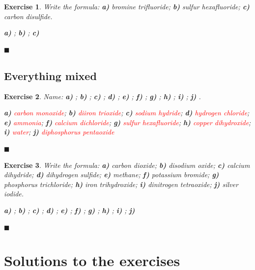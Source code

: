 \documentclass[12pt]{article}
\theoremstyle{mygreennumbox}
\newtheorem{ejercicioT}{Exercise}[section]
\newenvironment{exercise}{\begin{eBoxmygreen}\begin{ejercicioT}}{\hfill{\color{mygreen}\tiny\ensuremath{\blacksquare}}\end{ejercicioT}\end{eBoxmygreen}}
\begin{document}
\begin{exercise}
    Write the formula: \textbf{a)} bromine trifluoride; \textbf{b)} sulfur hexafluoride; \textbf{c)} carbon disulfide.
    \begin{solu}
        \textbf{a)} \textcolor{red}{}; \textbf{b)} \textcolor{red}{}; \textbf{c)} \textcolor{red}{}
    \end{solu}
\end{exercise}

\subsection{Everything mixed}

\begin{exercise}
    Name: \textbf{a)} ; \textbf{b)} ; \textbf{c)} ; \textbf{d)} ; \textbf{e)} ; \textbf{f)} ; \textbf{g)} ; \textbf{h)} ; \textbf{i)} ; \textbf{j)} .
    \begin{solu}
        \textbf{a)} \textcolor{red}{carbon monoxide}; \textbf{b)} \textcolor{red}{diiron trioxide}; \textbf{c)} \textcolor{red}{sodium hydride}; \textbf{d)} \textcolor{red}{hydrogen chloride}; \textbf{e)} \textcolor{red}{ammonia}; \textbf{f)} \textcolor{red}{calcium dichloride}; \textbf{g)} \textcolor{red}{sulfur hexafluoride}; \textbf{h)} \textcolor{red}{copper dihydroxide}; \textbf{i)} \textcolor{red}{water}; \textbf{j)} \textcolor{red}{diphosphorus pentaoxide}
    \end{solu}
\end{exercise}

\begin{exercise}
    Write the formula: \textbf{a)} carbon dioxide; \textbf{b)} disodium oxide; \textbf{c)} calcium dihydride; \textbf{d)} dihydrogen sulfide; \textbf{e)} methane; \textbf{f)} potassium bromide; \textbf{g)} phosphorus trichloride; \textbf{h)} iron trihydroxide; \textbf{i)} dinitrogen tetraoxide; \textbf{j)} silver iodide.
    \begin{solu}
        \textbf{a)} \textcolor{red}{}; \textbf{b)} \textcolor{red}{}; \textbf{c)} \textcolor{red}{}; \textbf{d)} \textcolor{red}{}; \textbf{e)} \textcolor{red}{}; \textbf{f)} \textcolor{red}{}; \textbf{g)} \textcolor{red}{}; \textbf{h)} \textcolor{red}{}; \textbf{i)} \textcolor{red}{}; \textbf{j)} \textcolor{red}{}
    \end{solu}
\end{exercise}


\newpage
\section*{Solutions to the exercises}

\end{document}
